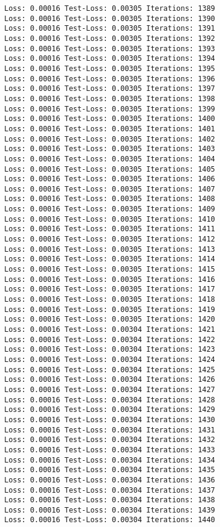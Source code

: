 \documentclass[11pt]{article}
\begin{document}
\begin{Verbatim}[commandchars=\\\{\}]
Loss: 0.00016 Test-Loss: 0.00305 Iterations: 1389
Loss: 0.00016 Test-Loss: 0.00305 Iterations: 1390
Loss: 0.00016 Test-Loss: 0.00305 Iterations: 1391
Loss: 0.00016 Test-Loss: 0.00305 Iterations: 1392
Loss: 0.00016 Test-Loss: 0.00305 Iterations: 1393
Loss: 0.00016 Test-Loss: 0.00305 Iterations: 1394
Loss: 0.00016 Test-Loss: 0.00305 Iterations: 1395
Loss: 0.00016 Test-Loss: 0.00305 Iterations: 1396
Loss: 0.00016 Test-Loss: 0.00305 Iterations: 1397
Loss: 0.00016 Test-Loss: 0.00305 Iterations: 1398
Loss: 0.00016 Test-Loss: 0.00305 Iterations: 1399
Loss: 0.00016 Test-Loss: 0.00305 Iterations: 1400
Loss: 0.00016 Test-Loss: 0.00305 Iterations: 1401
Loss: 0.00016 Test-Loss: 0.00305 Iterations: 1402
Loss: 0.00016 Test-Loss: 0.00305 Iterations: 1403
Loss: 0.00016 Test-Loss: 0.00305 Iterations: 1404
Loss: 0.00016 Test-Loss: 0.00305 Iterations: 1405
Loss: 0.00016 Test-Loss: 0.00305 Iterations: 1406
Loss: 0.00016 Test-Loss: 0.00305 Iterations: 1407
Loss: 0.00016 Test-Loss: 0.00305 Iterations: 1408
Loss: 0.00016 Test-Loss: 0.00305 Iterations: 1409
Loss: 0.00016 Test-Loss: 0.00305 Iterations: 1410
Loss: 0.00016 Test-Loss: 0.00305 Iterations: 1411
Loss: 0.00016 Test-Loss: 0.00305 Iterations: 1412
Loss: 0.00016 Test-Loss: 0.00305 Iterations: 1413
Loss: 0.00016 Test-Loss: 0.00305 Iterations: 1414
Loss: 0.00016 Test-Loss: 0.00305 Iterations: 1415
Loss: 0.00016 Test-Loss: 0.00305 Iterations: 1416
Loss: 0.00016 Test-Loss: 0.00305 Iterations: 1417
Loss: 0.00016 Test-Loss: 0.00305 Iterations: 1418
Loss: 0.00016 Test-Loss: 0.00305 Iterations: 1419
Loss: 0.00016 Test-Loss: 0.00305 Iterations: 1420
Loss: 0.00016 Test-Loss: 0.00304 Iterations: 1421
Loss: 0.00016 Test-Loss: 0.00304 Iterations: 1422
Loss: 0.00016 Test-Loss: 0.00304 Iterations: 1423
Loss: 0.00016 Test-Loss: 0.00304 Iterations: 1424
Loss: 0.00016 Test-Loss: 0.00304 Iterations: 1425
Loss: 0.00016 Test-Loss: 0.00304 Iterations: 1426
Loss: 0.00016 Test-Loss: 0.00304 Iterations: 1427
Loss: 0.00016 Test-Loss: 0.00304 Iterations: 1428
Loss: 0.00016 Test-Loss: 0.00304 Iterations: 1429
Loss: 0.00016 Test-Loss: 0.00304 Iterations: 1430
Loss: 0.00016 Test-Loss: 0.00304 Iterations: 1431
Loss: 0.00016 Test-Loss: 0.00304 Iterations: 1432
Loss: 0.00016 Test-Loss: 0.00304 Iterations: 1433
Loss: 0.00016 Test-Loss: 0.00304 Iterations: 1434
Loss: 0.00016 Test-Loss: 0.00304 Iterations: 1435
Loss: 0.00016 Test-Loss: 0.00304 Iterations: 1436
Loss: 0.00016 Test-Loss: 0.00304 Iterations: 1437
Loss: 0.00016 Test-Loss: 0.00304 Iterations: 1438
Loss: 0.00016 Test-Loss: 0.00304 Iterations: 1439
Loss: 0.00016 Test-Loss: 0.00304 Iterations: 1440

\end{Verbatim}
\end{document}
